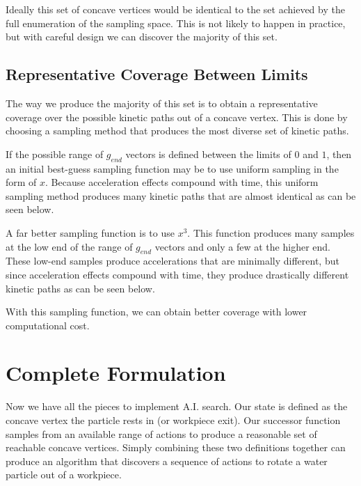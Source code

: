 Ideally this set of concave vertices would be identical to the set achieved by the full enumeration of the sampling space. This is not likely to happen in practice, but with careful design we can discover the majority of this set.

	\subsection{Representative Coverage Between Limits}

The way we produce the majority of this set is to obtain a representative coverage over the possible kinetic paths out of a concave vertex. This is done by choosing a sampling method that produces the most diverse set of kinetic paths.

If the possible range of $g_{end}$ vectors is defined between the limits of $0$ and $1$, then an initial best-guess sampling function may be to use uniform sampling in the form of $x$. Because acceleration effects compound with time, this uniform sampling method produces many kinetic paths that are almost identical as can be seen below.


A far better sampling function is to use $x^3$. This function produces many samples at the low end of the range of $g_{end}$ vectors and only a few at the higher end. These low-end samples produce accelerations that are minimally different, but since acceleration effects compound with time, they produce drastically different kinetic paths as can be seen below.


With this sampling function, we can obtain better coverage with lower computational cost.

	\section{Complete Formulation}

Now we have all the pieces to implement A.I. search. Our state is defined as the concave vertex the particle rests in (or workpiece exit). Our successor function samples from an available range of actions to produce a reasonable set of reachable concave vertices. Simply combining these two definitions together can produce an algorithm that discovers a sequence of actions to rotate a water particle out of a workpiece.

